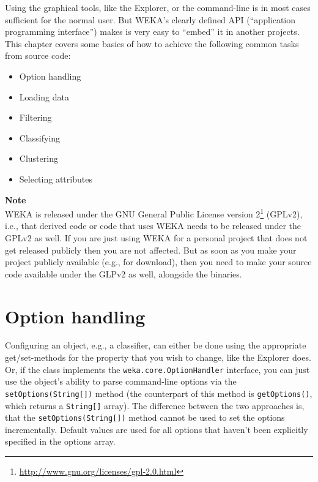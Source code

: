 
Using the graphical tools, like the Explorer, or the command-line is in most
cases sufficient for the normal user. But WEKA's clearly defined API
(``application programming interface'') makes is very easy to ``embed'' it in
another projects. This chapter covers some basics of how to achieve the
following common tasks from source code:
\begin{itemize}
	\item Option handling
	\item Loading data
	\item Filtering
	\item Classifying
	\item Clustering
	\item Selecting attributes
\end{itemize}

\noindent \textbf{Note} \\
\noindent WEKA is released under the GNU General Public License version
2\footnote{\url{http://www.gnu.org/licenses/gpl-2.0.html}{}} (GPLv2), i.e., that
derived
code or code that uses WEKA needs to be released under the GPLv2 as well. If
you are just using WEKA for a personal project that does not get released
publicly then you are not affected. But as soon as you make your project
publicly available (e.g., for download), then you need to make your source code
available under the GLPv2 as well, alongside the binaries.

\newpage

\section{Option handling}
Configuring an object, e.g., a classifier, can either be done using the
appropriate get/set-methods for the property that you wish to change, like the
Explorer does. Or, if the class implements the \texttt{weka.core.OptionHandler}
interface, you can just use the object's ability to parse command-line options
via the \texttt{setOptions(String[])} method (the counterpart of this method is
\texttt{getOptions()}, which returns a \texttt{String[]} array). The
difference between the two approaches is, that the \texttt{setOptions(String[])}
method cannot be used to set the options incrementally. Default values are used
for all options that haven't been explicitly specified in the options array.

